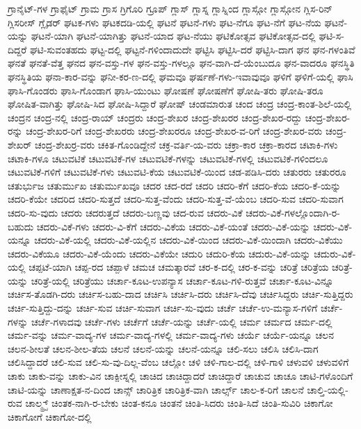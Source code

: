 {ಗ್ರಾನೈಟ್-ಗಳ
ಗ್ರಾಫೈಟ್
ಗ್ರಾಮ
ಗ್ರಾಸ
ಗ್ರಿಗೊರಿ
ಗ್ರೂಪ್
ಗ್ಲಾಸ್
ಗ್ಲಾಸ್ನ
ಗ್ಲಾಸ್ನಿಂದ
ಗ್ಲಾಸ್ಗೋ
ಗ್ಲಾಸ್ಗೋನ
ಗ್ಲಿಸ-ರಿನ್
ಗ್ಲಿಸರೀಸ್
ಗ್ಲೈಡರ್
ಘಟಕ-ಗಳು
ಘಟಕದಡಿ-ಯಲ್ಲಿ
ಘಟನೆ
ಘಟನೆ-ಗಳು
ಘಟ-ನೆಗೂ
ಘಟ-ನೆಗೆ
ಘಟ-ನೆಯ
ಘಟನೆ-ಯನ್ನು
ಘಟನೆ-ಯಾಗಿ
ಘಟನೆ-ಯಾಗಿತ್ತು
ಘಟನೆ-ಯಾದ
ಘಟ-ನೆಯು
ಘಟಿಕೋತ್ಸವ
ಘಟಿಕೋತ್ಸವ-ದಲ್ಲಿ
ಘಟಿ-ಸ-ದಿದ್ದರೆ
ಘಟಿ-ಸುವಂತಹದು
ಘಟ್ಟ-ದಲ್ಲಿ
ಘಟ್ಟನೆ-ಗಳಿಂದಾದುದೇ
ಘಟ್ಟಿಸಿ
ಘಟ್ಟಿಸಿ-ದರೆ
ಘಟ್ಟಿಸಿ-ದಾಗ
ಘನ
ಘನ-ಗಳಂತಿವೆ
ಘನತೆ
ಘನತೆ-ವೆತ್ತ
ಘನದ
ಘನ-ವಸ್ತು-ಗಳ
ಘನ-ವಸ್ತು-ಗಳಲ್ಲೂ
ಘನ-ವಾಗಿ-ದೆ-ಯೆಂಬುದೂ
ಘನ-ವಾದರೂ
ಘನಸ್ಥಿತಿ
ಘನಸ್ಥಿತಿಯ
ಘನಾ-ಕಾರ-ವನ್ನು
ಘನೀ-ಕರ-ಣ-ದಲ್ಲಿ
ಘಮವೂ
ಘರ್ಷಣೆ-ಗಳು-ಇವಾವುವೂ
ಘಳಿಗೆ
ಘಳಿಗೆ-ಯಲ್ಲಿ
ಘಾಸಿ
ಘಾಸಿ-ಗೊಂಡರು
ಘಾಸಿ-ಗೊಂಡಾಗ
ಘಾಸಿ-ಯುಂಟು
ಘೋಷಣೆ
ಘೋಷಣೆಗೆ
ಘೋಷಿ-ತರು
ಘೋಷಿ-ತರೂ
ಘೋಷಿತ-ವಾಗಿತ್ತು
ಘೋಷಿ-ಸಿದ
ಘೋಷಿ-ಸಿದ್ದಾರೆ
ಘೋಷ್
ಚಂಡಮಾರುತ
ಚಂದ
ಚಂದ್ರ
ಚಂದ್ರ-ಕಾಂತ-ಶಿಲೆ-ಯಲ್ಲಿ
ಚಂದ್ರನ
ಚಂದ್ರ-ನಲ್ಲಿ
ಚಂದ್ರ-ರಾಯ್
ಚಂದ್ರರು
ಚಂದ್ರ-ಶೇಖರ
ಚಂದ್ರ-ಶೇಖರರ
ಚಂದ್ರ-ಶೇಖರ-ರದ್ದು
ಚಂದ್ರ-ಶೇಖರ-ರನ್ನು
ಚಂದ್ರ-ಶೇಖರ-ರಿಗೆ
ಚಂದ್ರ-ಶೇಖರರು
ಚಂದ್ರ-ಶೇಖರರೂ
ಚಂದ್ರ-ಶೇಖರ-ವ-ರಿಗೆ
ಚಂದ್ರ-ಶೇಖರ-ವರು
ಚಂದ್ರ-ಶೇಖರ್
ಚಂದ್ರ-ಶೇಖರ್ರ-ವರು
ಚಕಿತ-ಗೊಂಡಿದ್ದೇನೆ
ಚಕ್ರ-ವರ್ತಿ-ಯ-ವರು
ಚಕ್ರಾ-ಕಾರ
ಚಕ್ರಾ-ಕಾರದ
ಚಟಾಕಿ-ಗಳು
ಚಟಾಕಿ-ಗಳೂ
ಚಟುವಟಿಕೆ
ಚಟುವಟಿಕೆ-ಗಳ
ಚಟುವಟಿಕೆ-ಗಳನ್ನು
ಚಟುವಟಿಕೆ-ಗಳಲ್ಲಿ
ಚಟುವಟಿಕೆ-ಗಳಿಂದಲೂ
ಚಟುವಟಿಕೆ-ಗಳಿಗೆ
ಚಟುವಟಿಕೆ-ಗಳು
ಚಟುವಟಿ-ಕೆಯ
ಚಟುವಟಿಕೆ-ಯಿಂದ
ಚಡ-ಪಡಿಸಿ-ದರು
ಚತುರರು
ಚತುರರೂ
ಚತುರ್ಭುಜ
ಚತುರ್ಮುಖ
ಚತುರ್ಮುಖವೂ
ಚದರ
ಚದ-ರದೆ
ಚದರಿ
ಚದರಿ-ಕೆಗೆ
ಚದರಿ-ಕೆಯ
ಚದರಿ-ಕೆ-ಯನ್ನು
ಚದರಿ-ಕೆಯೇ
ಚದರಿದ
ಚದರಿ-ಸುತ್ತದೆ
ಚದರಿ-ಸುತ್ತ-ವೆಂದು
ಚದರಿ-ಸುತ್ತ-ವೆ-ಯೆಂಬ
ಚದರಿ-ಸುವ
ಚದರಿ-ಸುವಾಗ
ಚದರಿ-ಸು-ವುದು
ಚದರು
ಚದರುತ್ತದೆ
ಚದರು-ಬಣ್ಣವು
ಚದ-ರುವ
ಚದರು-ವಿಕೆ
ಚದರು-ವಿಕೆ-ಗಳಲ್ಲೊಂದಾಗಿ-ರ-ಬಹುದು
ಚದರು-ವಿಕೆ-ಗಳು
ಚದರು-ವಿ-ಕೆಗೆ
ಚದರು-ವಿಕೆಯ
ಚದರು-ವಿಕೆ-ಯಂತೆ
ಚದರು-ವಿಕೆ-ಯನ್ನು
ಚದರು-ವಿಕೆ-ಯನ್ನೂ
ಚದರು-ವಿಕೆ-ಯಲ್ಲಿ
ಚದರು-ವಿಕೆ-ಯಲ್ಲಿನ
ಚದರು-ವಿಕೆ-ಯಿಂದ
ಚದರು-ವಿಕೆ-ಯಿಂದಾಗಿ
ಚದರು-ವಿಕೆಯು
ಚದರು-ವಿಕೆಯೂ
ಚದರು-ವಿಕೆ-ಯೆಂದು
ಚದರು-ವಿಕೆಯೇ
ಚದುರಿ
ಚದುರಿ-ಕೆಯ
ಚದುರು-ವಿಕೆ-ಯನ್ನು
ಚದುರು-ವಿಕೆ-ಯಲ್ಲಿ
ಚಪ್ಪಟೆ-ಯಾಗಿ
ಚಪ್ಪ-ರದ
ಚಪ್ಪಾಳೆ
ಚಮಚ
ಚಮತ್ಕಾರವೆ
ಚರ-ಕ-ದಲ್ಲಿ
ಚರ-ಕ-ವನ್ನು
ಚರಿತ್ರೆ
ಚರಿತ್ರೆಯ
ಚರಿತ್ರೆ-ಯನ್ನು
ಚರಿತ್ರೆ-ಯಲ್ಲಿ
ಚರಿತ್ರೆಯು
ಚರ್ಚಾ-ಕೂಟ-ಉಪನ್ಯಾಸ
ಚರ್ಚಾ-ಕೂಟ-ಗಳಿ-ರುತ್ತವೆ
ಚರ್ಚಾ-ಕೂಟ-ವಿನ್ನೂ
ಚರ್ಚಿಸ-ತೊಡಗಿ-ದರು
ಚರ್ಚಿಸ-ಬಹು-ದಾದ
ಚರ್ಚಿಸಿ
ಚರ್ಚಿಸಿ-ದರು
ಚರ್ಚಿಸಿ-ದೆವು
ಚರ್ಚಿಸಿದ್ದರು
ಚರ್ಚಿ-ಸುತ್ತಿದ್ದರು
ಚರ್ಚಿ-ಸುತ್ತಿದ್ದು-ದನ್ನು
ಚರ್ಚಿ-ಸುವ
ಚರ್ಚಿ-ಸುವಾಗ
ಚರ್ಚಿ-ಸು-ವುದು
ಚರ್ಚೆ
ಚರ್ಚೆ-ಉ-ಮನ್ಯಾಸ-ಗಳಿಗೆ
ಚರ್ಚೆ-ಗಳನ್ನು
ಚರ್ಚೆ-ಗಳಾದವು
ಚರ್ಚೆ-ಗಳು
ಚರ್ಚೆಗೆ
ಚರ್ಚೆ-ಯನ್ನು
ಚರ್ಚೆ-ಯಲ್ಲಿ
ಚರ್ಮ
ಚರ್ಮದ
ಚರ್ಮ-ದಲ್ಲಿ
ಚರ್ಮ-ವನ್ನು
ಚರ್ಮ-ವಾದ್ಯ-ಗಳ
ಚರ್ಮ-ವಾದ್ಯ-ಗಳಲ್ಲಿ
ಚರ್ಮ-ವಾದ್ಯ-ಗಳು
ಚರ್ಯೆ
ಚರ್ಯೆ-ಯನ್ನೂ
ಚಲನ
ಚಲನ-ಶೀಲತೆ
ಚಲನ-ಶೀಲ-ತೆಯ
ಚಲನೆ
ಚಲನೆ-ಯನ್ನು
ಚಲನೆ-ಯನ್ನೂ
ಚಲಿ-ಸಲು
ಚಲಿಸಿ
ಚಲಿಸಿ-ದಾಗ
ಚಲಿಸಿದ್ದಾದರೆ
ಚಲಿ-ಸುವ
ಚಲಿ-ಸು-ವು-ದಿಲ್ಲ-ವೆಂಬ
ಚಲ್ಲೋ
ಚಳಿ
ಚಳಿ-ಗಾಲ-ದಲ್ಲಿ
ಚಳಿ-ಗಾಳಿ
ಚಳುವಳಿ
ಚಳುವಳಿಗೆ
ಚಾಕು
ಚಾಕು-ವನ್ನು
ಚಾಕು-ವಿನ
ಚಾಕ್ಪೀಸ್ನಲ್ಲಿ
ಚಾಚಿದ
ಚಾಚಿದ್ದಾದರೆ
ಚಾಚಿದ್ದಾರೆ
ಚಾಚುವ
ಚಾಚೂ
ಚಾಟಿ-ಗಳೊಂದಿಗೆ
ಚಾಟಿ-ಯನ್ನು
ಚಾಣಾಕ್ಷತ-ನ-ದಿಂದ
ಚಾನ್ಸ್
ಚಾರಿತ್ರಿಕ
ಚಾರಿತ್ರಿಕ-ವಾಗಿ
ಚಾರ್ಲ್ಸ್
ಚಾಲ-ಕ-ರಿಗೆ
ಚಾಲನೆ
ಚಾಲ್ತಿ-ಯಲ್ಲಿ-ರುವ
ಚಾಲ್ಮ್ರ್ಸ್
ಚಿಂತಕ-ನಾಗಿ-ರ-ಬೇಕು
ಚಿಂತ-ಕನೂ
ಚಿಂತನೆ
ಚಿಂತಿ-ಸಿದರು
ಚಿಂತಿ-ಸಿದೆ
ಚಿಂತಿ-ಸುವಿರಿ
ಚಿಕಾಗೋ
ಚಿಕಾಗೋಗೆ
ಚಿಕಾಗೋ-ದಲ್ಲಿ
}
